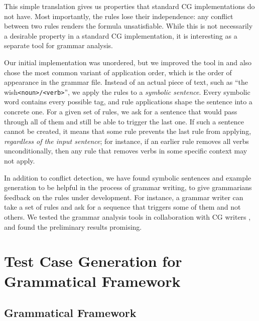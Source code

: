 \documentclass[conference]{IEEEtran}
\begin{document}
This simple translation gives us properties that standard CG implementations do not have.
Most importantly, the rules lose their independence: any conflict between two rules renders the formula unsatisfiable. 
While this is not necessarily a desirable property in a standard CG implementation, it is interesting as a separate tool for grammar analysis. 

Our initial implementation \cite{listenmaa_claessen2015} was unordered, but we improved the tool in \cite{listenmaa_claessen2016} and also chose the most common variant of application order, which is the order of appearance in the grammar file.
Instead of an actual piece of text, such as 
``the\texttt{} wish\texttt{\small <noun>/<verb>}'', we apply the rules to a {\em symbolic sentence}. 
Every symbolic word contains every possible tag, and rule applications shape the sentence into a concrete one.
For a given set of rules, we ask for a sentence that would pass through all of them and still be able to trigger the last one. 
If such a sentence cannot be created, it means that some rule prevents the last rule from applying, \emph{regardless of the input sentence}; for instance, if an earlier rule removes all verbs unconditionally, then any rule that removes verbs in some specific context may not apply. 

In addition to conflict detection, we have found symbolic sentences and example generation to be helpful in the process of grammar writing, 
to give grammarians feedback on the rules under development.
For instance, a grammar writer can take a set of rules and ask for a sequence that triggers some of them and not others.
We tested the grammar analysis tools in collaboration with CG writers \cite{listenmaa_et_al2017}, and found the preliminary results promising.


\section{Test Case Generation for Grammatical Framework}

\subsection{Grammatical Framework}
\end{document}

